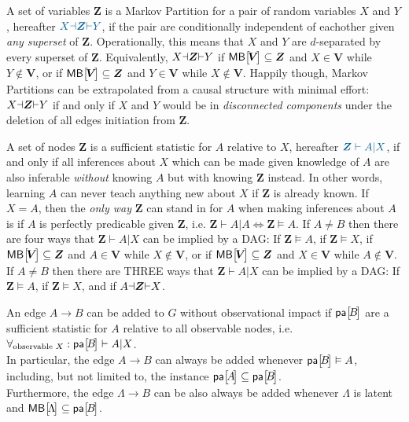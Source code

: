 {  A set of variables $\bm{Z}$ is a Markov Partition for a pair of random variables $X$ and $Y$, hereafter $\mblue{X\cramp{\dashv}\bm{Z}\cramp{\vdash}Y}$, if the pair are conditionally independent of eachother given \emph{any superset} of $\bm{Z}$. Operationally, this means that $X$ and $Y$ are $d$-separated by every superset of $\bm{Z}$. Equivalently, ${X\mathord{\dashv}\bm{Z}\mathord{\vdash}Y}$ if $\NamedFunction{MB}{\!\bm{V}\!}\subseteq \bm{Z}$ and $X\in \bm{V}$ while $Y\not\in \bm{V}$, or if $\NamedFunction{MB}{\!\bm{V}\!}\subseteq \bm{Z}$ and $Y\in \bm{V}$ while $X\not\in \bm{V}$. Happily though, Markov Partitions can be extrapolated from a causal structure with minimal effort: ${X\mathord{\dashv}\bm{Z}\mathord{\vdash}Y}$ if and only if $X$ and $Y$ would be in \emph{disconnected components} under the deletion of all edges initiation from $\bm{Z}$. 

 A set of nodes $\bm{Z}$ is a sufficient statistic for $A$ relative to $X$, hereafter $\mblue{\bm{Z}\vdash A|X}$,
if and only if all inferences about $X$ which can be made given knowledge of $A$ are also inferable \emph{without} knowing $A$ but with knowing $\bm{Z}$ instead. In other words, learning $A$ can never teach anything new about $X$ if $\bm{Z}$ is already known. If $X=A$, then the \emph{only way} $\bm{Z}$ can stand in for $A$ when making inferences about $A$ is if $A$ is perfectly predicable given $\bm{Z}$, i.e. ${\bm{Z}\vdash A|A\iff \bm{Z}\vDash A}$. If $A\neq B$ then there are four  ways that $\bm{Z}\vdash A|X$ can be implied by a DAG: If $\bm{Z}\vDash A$, if $\bm{Z}\vDash X$, if $\NamedFunction{MB}{\!\bm{V}\!}\subseteq \bm{Z}$ and $A\in \bm{V}$ while $X\not\in \bm{V}$, or if $\NamedFunction{MB}{\!\bm{V}\!}\subseteq \bm{Z}$ and $X\in \bm{V}$ while $A\not\in \bm{V}$.  If $A\neq B$ then there are THREE ways that $\bm{Z}\vdash A|X$ can be implied by a DAG: If $\bm{Z}\vDash A$, if $\bm{Z}\vDash X$, and if ${A\mathord{\dashv}\bm{Z}\mathord{\vdash}X}$.

\begin{theorem}\label{theo:edgeadding}
An edge $A\to B$ can be added to $G$ without observational impact if $\NamedFunction{pa}{\!B\!}$ are a sufficient statistic for $A$ relative to all observable nodes, i.e. $\forall_{\text{observable }X}:\NamedFunction{pa}{\!B\!}\vdash A|X$.\\
In particular, the edge $A\to B$ can always be added whenever $\NamedFunction{pa}{\!B\!}\vDash A$, including, but not limited to, the instance  $\NamedFunction{pa}{\!A\!}\subseteq \NamedFunction{pa}{\!B\!}$.\\
Furthermore, the edge $\Lambda\to B$ can be also always be added whenever $\Lambda$ is latent and $\NamedFunction{MB}{\!\Lambda\!}\subseteq\NamedFunction{pa}{\!B\!}$.
\end{theorem}

}
